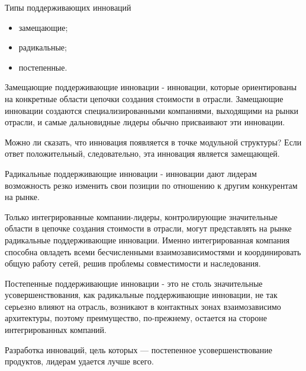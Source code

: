 \documentclass[_Venture_p3.tex]{subfiles}
\begin{document}
\begin{frame}{Типы поддерживающих инноваций}
\begin{itemize}
	\item замещающие;
	\item радикальные;
	\item постепенные.
\end{itemize}
\end{frame}

\begin{frame}{}
\begin{block}{Замещающие поддерживающие инновации}
	\quad - инновации, которые ориентированы на конкретные области цепочки создания стоимости в отрасли. Замещающие инновации создаются специализированными компаниями, выходящими на рынки отрасли, и самые дальновидные лидеры обычно присваивают эти инновации.
\end{block}
Можно ли сказать, что инновация появляется в точке модульной структуры? Если ответ положительный, следовательно, эта инновация является замещающей. 
\end{frame}

\begin{frame}{}
\begin{block}{Радикальные поддерживающие инновации}
	\quad - инновации дают лидерам возможность резко изменить свои позиции по отношению к другим конкурентам на рынке.
\end{block}
\small
Только интегрированные компании-лидеры, контролирующие значительные области в цепочке создания стоимости в отрасли, могут представлять на рынке радикальные поддерживающие инновации. Именно интегрированная компания способна овладеть всеми бесчисленными взаимозависимостями и координировать общую работу сетей, решив проблемы совместимости и наследования. 
\normalsize
\end{frame}

\begin{frame}{}
\begin{block}{Постепенные поддерживающие инновации}
	\quad - это не столь значительные усовершенствования, как радикальные поддерживающие инновации, не так серьезно влияют на отрасль, возникают в контактных зонах взаимозависимо архитектуры, поэтому преимущество, по-прежнему, остается на стороне интегрированных компаний. 
\end{block}
\small
Разработка инноваций, цель которых — постепенное усовершенствование продуктов, лидерам удается лучше всего. 
\normalsize
\end{frame}
\end{document}
